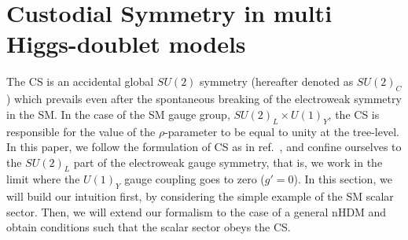 \documentclass[11pt]{article}
\begin{document}
\section{Custodial Symmetry in multi Higgs-doublet models}
\label{s:CS_defn}
%
The CS is an accidental global $SU(2)$ symmetry (hereafter denoted as $SU(2)_C$) which prevails even after the spontaneous breaking of the electroweak symmetry in the SM.  
In the case of the SM gauge group, $SU(2)_L \times U(1)_Y$, the CS is responsible for the value of the $\rho$-parameter to be equal to unity at the tree-level.  
In this paper, we follow the formulation of CS as in ref.~\cite{Kundu:2021pcg}, and confine ourselves to the $SU(2)_L$ part of the electroweak gauge symmetry, that is, we work in the limit where the $U(1)_Y$ gauge coupling goes to zero ($g'=0$).  
In this section, we will build our intuition first, by considering the simple example of the SM scalar sector.  
Then, we will extend our formalism to the case of a general nHDM and obtain conditions such that the scalar sector obeys the CS.
\end{document}
